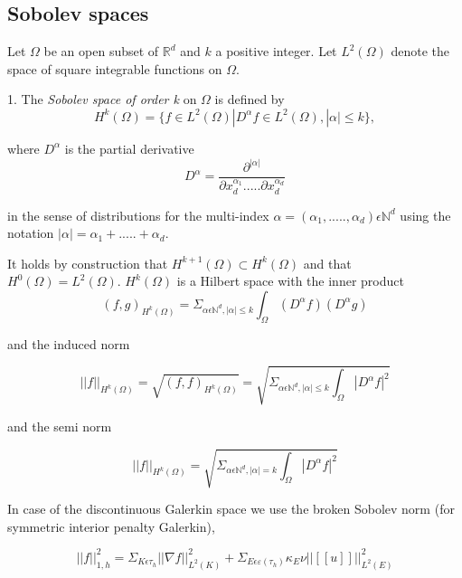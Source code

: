 \documentclass[a4paper,12pt]{book}
\begin{document}
\subsection{Sobolev spaces} \cite{crbm}

Let $\Omega$ be an open subset of $\mathbb{R}^d$ and $k$ a positive integer. Let $L^2(\Omega)$ denote the space of square integrable functions on $\Omega$. 

1. The \textit{Sobolev space of order k} on $\Omega$ is defined by\\
\begin{equation}
H^k (\Omega) = \lbrace f \in L^2 (\Omega) | D^\alpha f \in L^2 (\Omega), |\alpha| \leq k \rbrace ,
\end{equation} 

where $D^\alpha$ is the partial derivative
\begin{equation}
D^\alpha = \frac{\partial^{|\alpha|}}{\partial x_d^{\alpha_1} ..... \partial x_d^{\alpha_d}}
\end{equation}

in the sense of distributions for the multi-index $\alpha = (\alpha_1,.....,\alpha_d) \epsilon \mathbb{N}^d$ using the notation $|\alpha| = \alpha_1 + ..... + \alpha_d $.

It holds by construction that $H^{k+1}(\Omega) \subset H^k (\Omega)$ and that $H^0 (\Omega) = L^2 (\Omega)$. $H^k(\Omega)$ is a Hilbert space with the inner product
\begin{equation}
(f,g)_{H^k(\Omega)} = \Sigma_{\alpha \epsilon \mathbb{N}^d, |\alpha| \leq k} \int_\Omega (D^\alpha f) (D^\alpha g)
\end{equation}

and the induced norm 

\begin{equation}
||f||_{H^k (\Omega)} = \sqrt{(f,f)_{H^k(\Omega)}} = \sqrt{\Sigma_{\alpha \epsilon \mathbb{N}^d, |\alpha| \leq k} \int_\Omega |D^\alpha f|^2}
\end{equation}

and the semi norm 

\begin{equation}
||f||_{H^k (\Omega)} = \sqrt{\Sigma_{\alpha \epsilon \mathbb{N}^d, |\alpha| = k} \int_\Omega |D^\alpha f|^2}
\end{equation}

In case of the discontinuous Galerkin space we use the broken Sobolev norm (for symmetric interior penalty Galerkin), \cite{Montlaur2}

\begin{equation}
||f||_{1,h}^2 = \Sigma_{K \epsilon \tau_h} ||\nabla f||_{L^2(K)}^2 + \Sigma_{E \epsilon \varepsilon(\tau_h)} \kappa_E \nu ||[[u]]||_{L^2 (E)}^2
\end{equation}
\end{document}
